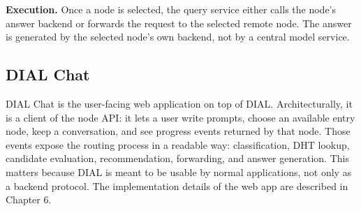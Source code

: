 \textbf{Execution.} Once a node is selected, the query service either calls the
node's answer backend or forwards the request to the selected remote node. The
answer is generated by the selected node's own backend, not by a central model
service.

\subsection{DIAL Chat}

DIAL Chat is the user-facing web application on top of DIAL. Architecturally,
it is a client of the node API: it lets a user write prompts, choose an
available entry node, keep a conversation, and see progress events returned by
that node. Those events expose the routing process in a readable way:
classification, DHT lookup, candidate evaluation, recommendation, forwarding,
and answer generation. This matters because DIAL is meant to be usable by
normal applications, not only as a backend protocol. The implementation details
of the web app are described in Chapter 6.
